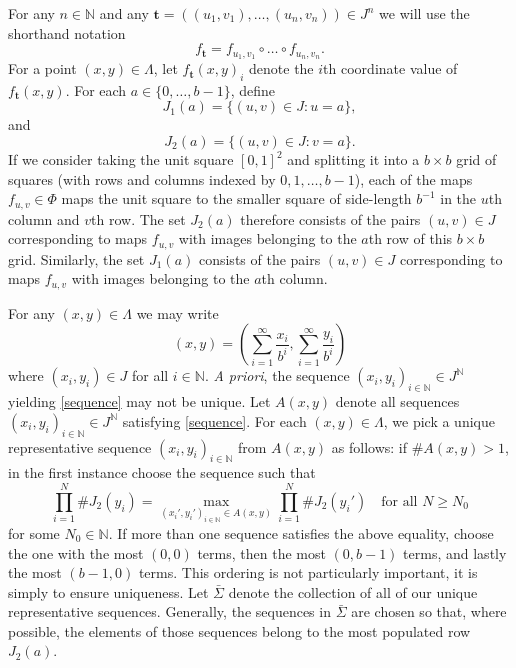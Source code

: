 \documentclass[12pt]{article}
\theoremstyle{remark}
\numberwithin{equation}{section}
\renewcommand{\Bbb}[1]{\mathbb{#1}}
\newcommand{\N}{{\Bbb N}}         %
\newcommand{\bt}{\mathbf{t}}
\newcommand{\0}{\mathbf{0}}
\begin{document}
For any $n \in \N$ and any $\bt=((u_{1},v_{1}), \dots , (u_{n},v_{n})) \in J^{n}$ we will use the shorthand notation 
\[f_{\bt}=f_{u_{1},v_{1}} \circ \dots \circ f_{u_{n},v_{n}}.\] 
For a point $(x,y) \in \Lambda$, let $f_{\bt}(x,y)_{i}$ denote the $i$th coordinate value of $f_{\bt}(x,y)$. For each $a \in \{0, \dots , b-1\}$, define
\[J_{1}(a)=\{(u,v) \in J : u=a\},\]
and    
\[J_{2}(a)=\{(u,v) \in J : v=a\}.\]
 If we consider taking the unit square $[0,1]^2$ and splitting it into a $b \times b$ grid of squares (with rows and columns indexed by $0,1,\dots,b-1$), each of the maps $f_{u,v} \in \Phi$ maps the unit square to the smaller square of side-length $b^{-1}$ in the $u$th column and $v$th row. The set $J_{2}(a)$ therefore consists of the pairs $(u,v) \in J$ corresponding to maps $f_{u,v}$ with images belonging to the $a$th row of this $b \times b$ grid. Similarly, the set $J_{1}(a)$ consists of the pairs $(u,v) \in J$ corresponding to maps $f_{u,v}$ with images belonging to the $a$th column.

For any $(x,y) \in \Lambda$ we may write
\begin{equation} \label{sequence}
    (x,y)=\left( \sum_{i=1}^{\infty}{\frac{x_{i}}{b^{i}}}, \sum_{i=1}^{\infty}{\frac{y_{i}}{b^{i}}} \right)
\end{equation}
where $(x_{i},y_{i}) \in J$ for all $i \in \N$. \emph{A priori}, the sequence $(x_{i},y_{i})_{i \in \N} \in J^{\N}$ yielding \eqref{sequence} may not be unique. Let $A(x,y)$ denote all sequences $(x_{i},y_{i})_{i \in \N} \in J^{\N}$ satisfying \eqref{sequence}. For each $(x,y) \in \Lambda$, we pick a unique representative sequence $(x_{i},y_{i})_{i \in \N}$ from $A(x,y)$ as follows: if $\#A(x,y) >1$, in the first instance choose the sequence such that
\begin{equation*}
    \prod_{i=1}^{N} \#J_{2}(y_{i}) = \max_{(x_{i}',y_{i}')_{i \in \N} \in A(x,y)} \prod_{i=1}^{N} \#J_{2}(y_{i}')  \quad \text{for all } N \geq N_{0}
\end{equation*}
for some $N_{0} \in \N$. If more than one sequence satisfies the above equality, choose the one with the most $(0,0)$ terms, then the most $(0,b-1)$ terms, and lastly the most $(b-1,0)$ terms. This ordering is not particularly important, it is simply to ensure uniqueness. Let $\bar{\Sigma}$ denote the collection of all of our unique representative sequences. Generally, the sequences in $\bar{\Sigma}$ are chosen so that, where possible, the elements of those sequences belong to the most populated row $J_{2}(a)$.
  
\end{document}
